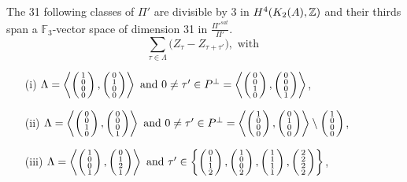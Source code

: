 \begin{prop}\label{XXXI}
The 31 following classes of $\Pi'$ are divisible by 3 in $H^{4}(K_2(A),\Z)$ and their thirds span a $\mathbb F_3$-vector space of dimension 31 in $\frac{\Pi'^{sat}}{\Pi'}$.
$$\sum_{\tau\in\Lambda} \Big(Z_{\tau} - Z_{\tau+\tau'}\Big), \text{ with }$$
\begin{itemize}
\item[(i)]
$\Lambda=\plan{1\\0\\0\\0}{0\\1\\0\\0} \text{ and } 0\neq \tau'\in P^\perp = \plan{0\\0\\1\\0}{0\\0\\0\\1} $,

\item[(ii)] 
$\Lambda=\plan{0\\0\\1\\0}{0\\0\\0\\1}  \text{ and } 0\neq \tau' \in P^\perp = \plan{1\\0\\0\\0}{0\\1\\0\\0} \setminus \vect{1\\0\\0\\0}$,

\item[(iii)] 
$\Lambda=\plan{1\\0\\0\\1}{0\\1\\2\\1} \text{ and } \tau' \in \left\{ \vect{0\\1\\1\\2},\vect{1\\0\\0\\2},\vect{1\\1\\1\\1},\vect{2\\2\\2\\2} \right\}$,


\end{itemize}
\end{prop}
